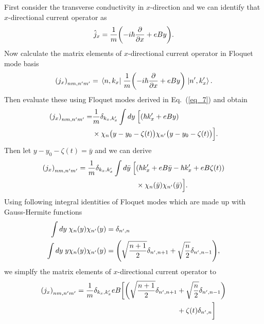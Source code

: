 First consider the transverse conductivity in $x$-direction and we can identify that $x$-directional current operator as
\begin{equation} \label{eq_d4}
  \hat{j}_x = \frac{1}{m} \qty(-i\hbar\pdv{x} + eBy).
\end{equation}
Now calculate the matrix elements of $x$-directional current operator in Floquet mode basis
\begin{equation} \label{eq_d5}
  \qty({j}_x)_{nm,n'm'} =
  \mel{n,k_x}{\;\frac{1}{m} \qty(-i\hbar\pdv{x} + eBy)\;}{n',k'_x}.
\end{equation}
Then evaluate these using Floquet modes derived in Eq.~(\ref{eq_7}) and obtain
\begin{equation} \label{eq_d6}
  \begin{aligned}
    \qty({j}_x)_{nm,n'm'} = &
    \frac{1}{{m}}
    \delta_{k_x,k'_x}
    \int dy \;
    \Big[
    \qty(\hbar k'_x + eBy) \\
    & \times
     \chi_{n}\big(y - y_0 - \zeta(t)\big)
    \chi_{n'}\big(y - y_0 - \zeta(t)\big)
    \Big].
  \end{aligned}
\end{equation}
Then let $y - y_0 - \zeta(t) = \bar{y}$ and we can derive
\begin{equation} \label{eq_d7}
  \begin{aligned}
    \qty({j}_x)_{nm,n'm'} =
    \frac{1}{{m}}
    \delta_{k_x,k'_x}
    \int d\bar{y} \;
    \Big[ &
    \qty(\hbar k'_x + eB\bar{y} -\hbar k'_x + eB\zeta(t)) \\
    & \times
    \chi_{n}(\bar{y})
    \chi_{n'}(\bar{y})
    \Big].
  \end{aligned}
\end{equation}
Using following integral identities of Floquet modes which are made up with  Gauss-Hermite functions \cite{vedenyapin11,szego59}
\begin{subequations} \label{eq_d8}
  \begin{align}
    \int d{y} \;
    \chi_{n}({y})
    \chi_{n'}({y}) &=
    \delta_{n',n} \\
    \int dy \;
    y
    \chi_{n}({y})
    \chi_{n'}({y}) &=
    \qty(\sqrt{\frac{n+1}{2}} \delta_{n',n+1} + \sqrt{\frac{n}{2}}
    \delta_{n',n-1}),
  \end{align}
\end{subequations}
we simplfy the matrix elements of $x$-directional current operator to
\begin{equation} \label{eq_d9}
  \begin{aligned}
    \qty({j}_x)_{nm,n'm'} =
    \frac{1}{{m}}
    \delta_{k_x,k'_x}
    eB
    \bigg[
    \bigg(\sqrt{\frac{n+1}{2}} \delta_{n',n+1} & + \sqrt{\frac{n}{2}}
    \delta_{n',n-1}\bigg) \\
    &
    + \zeta(t) \delta_{n',n}
    \bigg]
  \end{aligned}
\end{equation}

